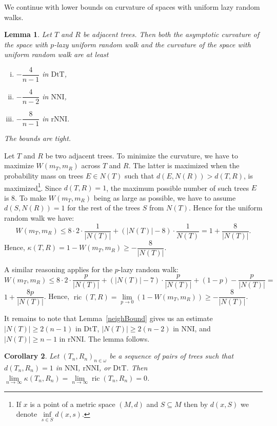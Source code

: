 \documentclass{amsart}
\newtheorem{lemma}{Lemma}
\newtheorem{corollary}[lemma]{Corollary}
\theoremstyle{definition}
\newcommand{\nni}{\mathrm{NNI}}
\newcommand{\rnni}{\mathrm{rNNI}}
\newcommand{\dtt}{\mathrm{DtT}}
\newcommand{\ric}{\operatorname{ric}}
\begin{document}
{We continue with lower bounds on curvature of spaces with uniform lazy random walks.

\begin{lemma}\label{uniformLower}
Let $T$ and $R$ be adjacent trees.
Then both the asymptotic curvature of the space with $p$-lazy uniform random walk and the curvature of the space with uniform random walk are at least
\begin{enumerate}[(i)]
\item $-\dfrac{4}{n-1}$ in $\dtt$,
\item $-\dfrac{4}{n-2}$ in $\nni$,
\item $-\dfrac{8}{n-1}$ in $\rnni$.
\end{enumerate}

The bounds are tight.
\end{lemma}

\proof
Let $T$ and $R$ be two adjacent trees.
To minimize the curvature, we have to maximize $W(m_T, m_R)$ across $T$ and $R$.
The latter is maximized when the probability mass on trees $E\in N(T)$ such that $d(E, N(R)) > d(T, R)$, is
maximized\footnote{If $x$ is a point of a metric space $(M,d)$ and $S \subseteq M$ then by $d(x,S)$ we denote $\inf\limits_{s \in S} d(x,s)$.}.
Since $d(T, R) = 1$, the maximum possible number of such trees $E$ is
$8$.
To make $W(m_T,m_R)$ being as large as possible, we have to assume $d(S, N(R)) = 1$ for the rest of the trees $S$ from $N(T)$.
Hence for the uniform random walk we have:
\[
W(m_T,m_R)\leq 8 \cdot 2 \cdot \frac{1}{|N(T)|} +
(|N(T)| - 8) \cdot \frac{1}{N(T)} = 1 + \dfrac{8}{|N(T)|}.
\]
Hence, $\kappa(T,R) = 1 - W(m_T,m_R) \geq - \dfrac{8}{|N(T)|}$.

A similar reasoning applies for the $p$-lazy random walk:
\[
W(m_T,m_R)\leq 8 \cdot 2 \cdot \frac{p}{|N(T)|} +
(|N(T)| - 7) \cdot \frac{p}{|N(T)|} + (1-p) - \frac{p}{|N(T)|} =
\]
$1 + \dfrac{8p}{|N(T)|}$.
Hence, $\ric(T,R) = \lim\limits_{p\to0}\left(1 - W(m_T,m_R)\right) \geq - \dfrac{8}{|N(T)|}$.

It remains to note that Lemma~\ref{neighBound} gives us an estimate $|N(T)| \geq 2(n-1)$ in $\dtt$, $|N(T)| \geq 2(n-2)$ in $\nni$, and $|N(T)| \geq n-1$ in $\rnni$.
The lemma follows.
\endproof

\begin{corollary}\label{flatInLimDTS}
Let $(T_n,R_n)_{n\in\omega}$ be a sequence of pairs of trees such that $d(T_n,R_n) = 1$ in $\nni$, $\rnni$, or $\dtt$.
Then $\lim\limits_{n \to \infty}\kappa(T_n,R_n) = \lim\limits_{n \to \infty}\ric(T_n,R_n) = 0$.
\end{corollary}

}
\end{document}
